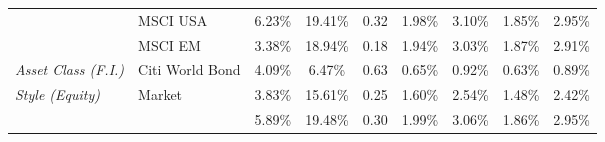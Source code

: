 \documentclass[12pt]{article}
\begin{document}
\begin{table}[H]
{\begin{tabular}{@{}llccccccc@{}}
                              & MSCI USA                                               & 6.23\%                                                      & 19.41\%                                                         & 0.32                                                   & 1.98\%                                                        & 3.10\%                                                       & 1.85\%                                                        & 2.95\%                                                      \\
                              & MSCI EM                                                & 3.38\%                                                      & 18.94\%                                                         & 0.18                                                   & 1.94\%                                                        & 3.03\%                                                       & 1.87\%                                                        & 2.91\%                                                      \\ \midrule
\textit{Asset Class (F.I.)}   & Citi World Bond                                        & 4.09\%                                                      & 6.47\%                                                          & 0.63                                                   & 0.65\%                                                        & 0.92\%                                                       & 0.63\%                                                        & 0.89\%                                                      \\ \midrule
\textit{Style (Equity)}       & Market                                                 & 3.83\%                                                      & 15.61\%                                                         & 0.25                                                   & 1.60\%                                                        & 2.54\%                                                       & 1.48\%                                                        & 2.42\%                                                      \\
                              &                                                        & {\color[HTML]{303498} 5.89\%}                               & {\color[HTML]{303498} 19.48\%}                                  & {\color[HTML]{303498} 0.30}                            & {\color[HTML]{303498} 1.99\%}                                 & {\color[HTML]{303498} 3.06\%}                                & {\color[HTML]{303498} 1.86\%}                                 & {\color[HTML]{303498} 2.95\%}                               \\

\end{tabular}}
\end{table}
\end{document}
